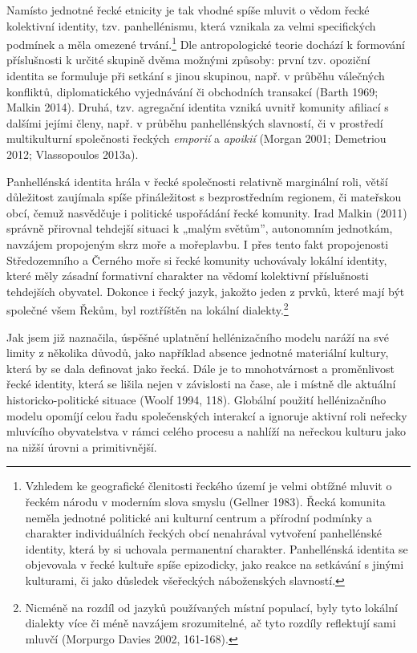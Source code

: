 Namísto jednotné řecké etnicity je tak vhodné spíše mluvit o vědom řecké kolektivní identity, tzv. panhellénismu, která vznikala za velmi specifických podmínek a měla omezené trvání.\footnote{Vzhledem ke geografické členitosti řeckého území je velmi obtížné mluvit o řeckém národu v moderním slova smyslu (Gellner 1983). Řecká komunita neměla jednotné politické ani kulturní centrum a přírodní podmínky a charakter individuálních řeckých obcí nenahrával vytvoření panhellénské identity, která by si uchovala permanentní charakter. Panhellénská identita se objevovala v řecké kultuře spíše epizodicky, jako reakce na setkávání s jinými kulturami, či jako důsledek všeřeckých náboženských slavností.} Dle antropologické teorie dochází k formování příslušnosti k určité skupině dvěma možnými způsoby: první tzv. opoziční identita se formuluje při setkání s jinou skupinou, např. v průběhu válečných konfliktů, diplomatického vyjednávání či obchodních transakcí (Barth 1969; Malkin 2014). Druhá, tzv. agregační identita vzniká uvnitř komunity afiliací s dalšími jejími členy, např. v průběhu panhellénských slavností, či v prostředí multikulturní společnosti řeckých {\em emporií} a {\em apoikií} (Morgan 2001; Demetriou 2012; Vlassopoulos 2013a).

Panhellénská identita hrála v řecké společnosti relativně marginální roli, větší důležitost zaujímala spíše přináležitost s bezprostředním regionem, či mateřskou obcí, čemuž nasvědčuje i politické uspořádání řecké komunity. Irad Malkin (2011) správně přirovnal tehdejší situaci k „malým světům”, autonomním jednotkám, navzájem propojeným skrz moře a mořeplavbu. I přes tento fakt propojenosti Středozemního a Černého moře si řecké komunity uchovávaly lokální identity, které měly zásadní formativní charakter na vědomí kolektivní příslušnosti tehdejších obyvatel. Dokonce i řecký jazyk, jakožto jeden z prvků, které mají být společné všem Řekům, byl roztříštěn na lokální dialekty.\footnote{Nicméně na rozdíl od jazyků používaných místní populací, byly tyto lokální dialekty více či méně navzájem srozumitelné, ač tyto rozdíly reflektují sami mluvčí (Morpurgo Davies 2002, 161-168).}

Jak jsem již naznačila, úspěšné uplatnění hellénizačního modelu naráží na své limity z několika důvodů, jako například absence jednotné materiální kultury, která by se dala definovat jako řecká. Dále je to mnohotvárnost a proměnlivost řecké identity, která se lišila nejen v závislosti na čase, ale i místně dle aktuální historicko-politické situace (Woolf 1994, 118). Globální použití hellénizačního modelu opomíjí celou řadu společenských interakcí a ignoruje aktivní roli neřecky mluvícího obyvatelstva v rámci celého procesu a nahlíží na neřeckou kulturu jako na nižší úrovni a primitivnější.

